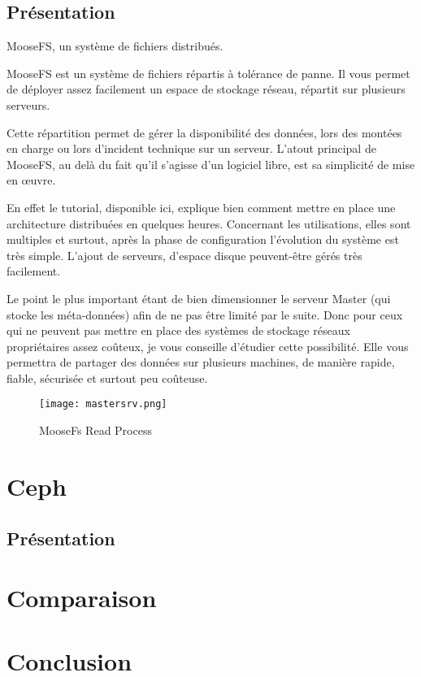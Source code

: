 \documentclass[12pt]{report}
\begin{document}
		\section{Présentation}
    
		MooseFS, un système de fichiers distribués.
		
		MooseFS est un système de fichiers répartis à tolérance de panne. Il vous permet de déployer assez facilement un espace de stockage réseau, répartit sur plusieurs serveurs.
		
		Cette répartition permet de gérer la disponibilité des données, lors des montées en charge ou lors d’incident technique sur un serveur. L’atout principal de MooseFS, au delà du fait qu’il s’agisse d’un logiciel libre, est sa simplicité de mise en œuvre.
		
		En effet le tutorial, disponible ici, explique bien comment mettre en place une architecture distribuées en quelques heures. Concernant les utilisations, elles sont multiples et surtout, après la phase de configuration l’évolution du système est très simple. L’ajout de serveurs, d’espace disque peuvent-être gérés très facilement.
		
		Le point le plus important étant de bien dimensionner le serveur Master (qui stocke les méta-données) afin de ne pas être limité par le suite. Donc pour ceux qui ne peuvent pas mettre en place des systèmes de stockage réseaux propriétaires assez coûteux, je vous conseille d’étudier cette possibilité. Elle vous permettra de partager des données sur plusieurs machines, de manière rapide, fiable, sécurisée et surtout peu coûteuse.

\begin{figure}[p]
	\texttt{[image: mastersrv.png]}
	\caption{MooseFs Read Process}
	\label{identifiant test}
\end{figure} 

	\chapter{Ceph}
		\section{Présentation}

	\chapter{Comparaison}

	\chapter{Conclusion}
\end{document}
